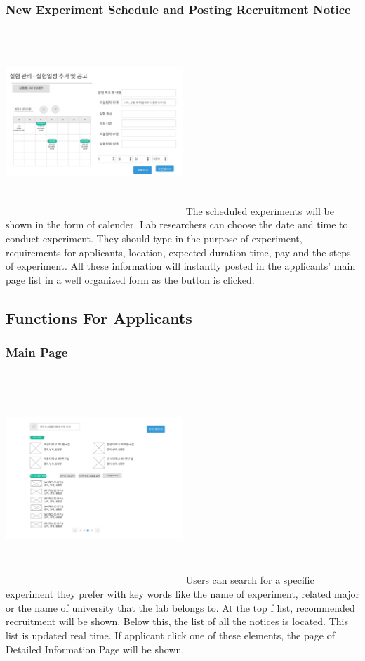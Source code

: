 \documentclass[letterpaper, 10 pt, conference]{ieeeconf}  %
\begin{document}
\subsubsection{New Experiment Schedule and Posting Recruitment Notice}
\includegraphics[width=0.5\textwidth,height = 7cm]{Oven_ver2/ver2]10_scheduleNotice.jpg}
The scheduled experiments will be shown in the form of calender. Lab researchers can choose the date and time to conduct experiment. They should type in the purpose of experiment, requirements for applicants, location, expected duration time, pay and the steps of experiment. All these information will instantly posted in the applicants' main page list in a well organized form as the button is clicked. 


\subsection{Functions For Applicants}
\subsubsection{Main Page\\}
\includegraphics[width=0.5\textwidth,height = 8cm]{Oven_ver2/ver2]11_applicantMainPage.jpg}
Users can search for a specific experiment they prefer with key words like the name of experiment, related major or the name of university that the lab belongs to. At the top f list, recommended recruitment will be shown. Below this, the list of all the notices is located. This list is updated real time. If applicant click one of these elements, the page of Detailed Information Page will be shown. 
\end{document}
